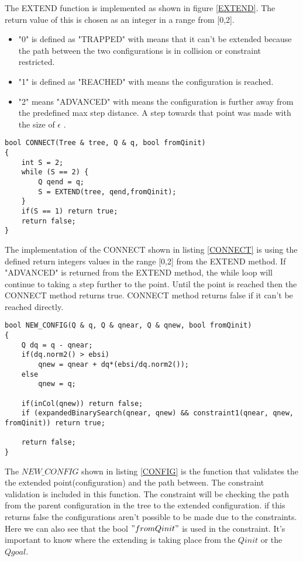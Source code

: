 The EXTEND function is implemented as shown in figure \ref{EXTEND}. The return value of this is chosen as an integer in a range from [0,2].
\begin{itemize}
\item "0" is defined as "TRAPPED" with means that it can't be extended because the path between the two configurations is in collision or constraint restricted.
\item "1" is defined as "REACHED" with means the configuration is reached.
\item "2" means "ADVANCED" with means the configuration is further away from the predefined max step distance. A step towards that point was made with the size of $\epsilon$ .
\end{itemize}

\begin{lstlisting}[caption=The implementation of the planner, label=CONNECT]
bool CONNECT(Tree & tree, Q & q, bool fromQinit)
{
    int S = 2;
    while (S == 2) {
        Q qend = q;
        S = EXTEND(tree, qend,fromQinit);
    }
    if(S == 1) return true;
    return false;
}
\end{lstlisting}

The implementation of the CONNECT shown in listing \ref{CONNECT} is using the defined return integers values in the range [0,2] from the EXTEND method. If "ADVANCED" is returned from the EXTEND method, the while loop will continue to taking a step further to the point. Until the point is reached then the CONNECT method returns true. CONNECT method returns false if it can't be reached directly.

\begin{lstlisting}[caption=The implementation of the planner, label=CONFIG]
bool NEW_CONFIG(Q & q, Q & qnear, Q & qnew, bool fromQinit)
{
    Q dq = q - qnear;
    if(dq.norm2() > ebsi)
        qnew = qnear + dq*(ebsi/dq.norm2());
    else
        qnew = q;
    
    if(inCol(qnew)) return false;
    if (expandedBinarySearch(qnear, qnew) && constraint1(qnear, qnew, fromQinit)) return true;
    
    return false;
}
\end{lstlisting}

The $NEW\_CONFIG$ shown in listing \ref{CONFIG} is the function that validates the the extended point(configuration) and the path between. The constraint validation is included in this function. The constraint will be checking the path from the parent configuration in the tree to the extended configuration. if this returns false the configurations aren't possible to be made due to the constraints. Here we can also see that the bool $"fromQinit"$ is used in the constraint. It's important to know where the extending is taking place from the $Qinit$ or the $Qgoal$.